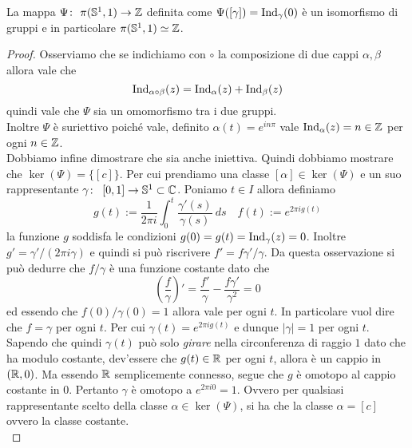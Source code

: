 \begin{theorem}
    La mappa $\Psi \colon\ \pi(\mathbb{S}^1, 1) \rightarrow \mathbb{Z}$ definita come $\Psi(\left[
    \gamma \right]) = \operatorname{Ind}_\gamma(0)$ è un isomorfismo di gruppi
    e in particolare $\pi(\mathbb{S}^1, 1) \simeq \mathbb{Z}$.
    \label{thr:gruppo-fondamentale-della-circonferenza}
\end{theorem}
\begin{proof}
    Osserviamo che se indichiamo con $\circ$ la composizione di due cappi
    $\alpha, \beta$ allora vale che 
    \begin{equation*}
      \operatorname{Ind}_{\alpha \circ \beta}(z)
      = \operatorname{Ind}_\alpha(z) + \operatorname{Ind}_\beta(z) 
    \end{equation*}
    quindi vale che $\Psi$ sia un omomorfismo tra i due gruppi. \\

    Inoltre $\Psi$ è suriettivo poiché vale, definito $\alpha(t)
    = e^{in\pi}$ vale $\operatorname{Ind}_\alpha(z) = n \in \mathbb{Z}$ per ogni $n
    \in \mathbb{Z}$. \\

    Dobbiamo infine dimostrare che sia anche iniettiva. Quindi dobbiamo
    mostrare che $\operatorname{ker}(\Psi) = \{\left[ c \right]\}$. Per cui
    prendiamo una classe $\left[ \alpha \right] \in
    \operatorname{ker}(\Psi)$ e un suo rappresentante
    $\gamma \colon\ \left[ 0,1 \right] \rightarrow \mathbb{S}^1 \subset \mathbb{C}$. Poniamo $t
    \in I$ allora definiamo 
    \begin{equation*}
      g(t) := \frac{1}{2\pi i} \int^t_0 \frac{\gamma'(s)}{\gamma(s)}\ ds
      \quad f(t) := e^{2\pi i g(t)}
    \end{equation*}
    la funzione $g$ soddisfa le condizioni $g(0) = g(t)
    = \operatorname{Ind}_\gamma(z) = 0$. Inoltre $g' = \gamma' / (2\pi
    i \gamma)$ e quindi si può riscrivere $f' = f\gamma' / \gamma$. Da
    questa osservazione si può dedurre che $f/\gamma$ è una funzione
    costante dato che 
    \begin{equation*}
      \left(\frac{f}{\gamma}\right)' = \frac{f'}{\gamma}
      - \frac{f\gamma'}{\gamma^2} = 0
    \end{equation*}
    ed essendo che $f(0)/\gamma(0) = 1$ allora vale per ogni $t$. In
    particolare vuol dire che $f = \gamma$ per ogni $t$. Per cui $\gamma(t)
    = e^{2\pi i g(t)}$ e dunque $|\gamma| = 1$ per ogni $t$. 
    Sapendo che quindi $\gamma(t)$ può solo \textit{girare} nella
    circonferenza di raggio $1$ dato che ha modulo costante, dev'essere che 
    $g(t) \in \mathbb{R}$ per ogni $t$, allora è un cappio in $(\mathbb{R}, 0)$. Ma essendo
    $\mathbb{R}$ semplicemente connesso, segue che $g$ è omotopo al cappio
    costante in $0$.
    Pertanto $\gamma$ è omotopo a $e^{2\pi i 0} = 1$. Ovvero per qualsiasi
    rappresentante scelto della classe $\alpha \in \operatorname{ker}(\Psi)$, 
    si ha che la classe $\alpha = \left[c\right]$ ovvero la classe costante. \\
    

\end{proof}
